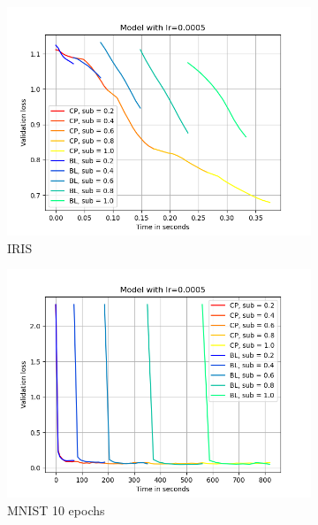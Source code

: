 \begin{figure}[h]
    \centering
    \begin{subfigure}[b]{0.24\textwidth}
        \centering
        \includegraphics[width=\textwidth]{figures/22_07/iris/loss_time_0.0005.png}
        \caption{IRIS}
        \label{fig:2a}
    \end{subfigure}
    \begin{subfigure}[b]{0.24\textwidth}
        \centering
        \includegraphics[width=\textwidth]{figures/22_07/10ep/loss_time_0.0005.png}
        \caption{MNIST 10 epochs}
        \label{fig:2b}
    \end{subfigure}
    \begin{subfigure}[b]{0.24\textwidth}

\end{subfigure}
\end{figure}
